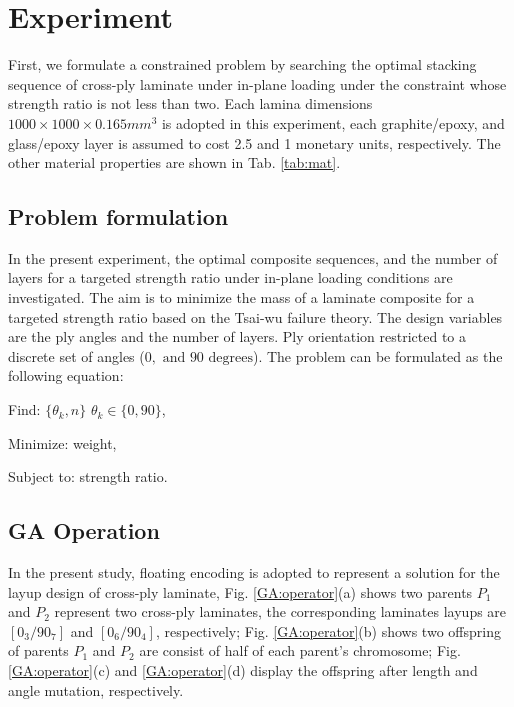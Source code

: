 \section{Experiment}
First, we formulate a constrained problem by searching the optimal stacking
sequence of cross-ply laminate under in-plane loading under the constraint
whose strength ratio is not less than two.  Each lamina dimensions $1000 \times
1000 \times 0.165 mm^3$ is adopted in this experiment, each graphite/epoxy,
and glass/epoxy layer is assumed to cost 2.5 and 1 monetary units,
respectively. The other material properties are shown in Tab. \ref{tab:mat}. 


\subsection{Problem formulation}

In the present experiment, the optimal composite sequences, and the number of
layers for a targeted strength ratio under in-plane loading conditions are
investigated.  The aim is to minimize the mass of a laminate composite for a
targeted strength ratio based on the Tsai-wu failure theory. The design
variables are the ply angles and the number of layers.  Ply orientation
restricted to a discrete set of angles ($0, \text{ and } 90 \text{ degrees} $).
The problem can be formulated as the following equation:

Find: $\{\theta_k, n\}$ $\theta_k \in \{ 0,90\}$,

Minimize: weight,

Subject to: strength ratio.


\subsection{GA Operation}


In the present study, floating encoding is adopted to represent a solution for
the layup design of cross-ply laminate, Fig. \ref{GA:operator}(a) shows two
parents $P_1$ and $P_2$ represent two cross-ply laminates, the
corresponding laminates layups are $[0_3/90_7]$ and $[0_6/90_4]$,
respectively; Fig. \ref{GA:operator}(b) shows two offspring of parents $P_1$
and $P_2$ are consist of half of each parent's chromosome; Fig. 
\ref{GA:operator}(c) and \ref{GA:operator}(d) display the offspring after
length and angle mutation, respectively.

